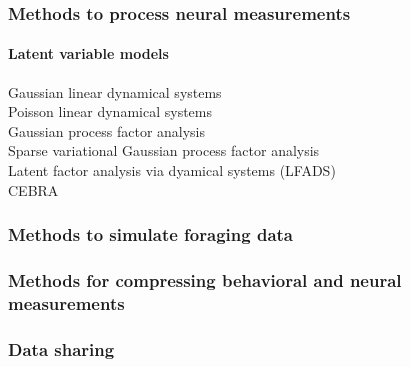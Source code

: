 \subsubsection{Methods to process neural measurements}

\paragraph{Latent variable models}

\begin{description}

    \item[Gaussian linear dynamical systems]

    \item[Poisson linear dynamical systems]

    \item[Gaussian process factor analysis]

    \item[Sparse variational Gaussian process factor analysis]

    \item[Latent factor analysis via dyamical systems (LFADS)]

    \item[CEBRA]

\end{description}

\subsubsection{Methods to simulate foraging data}

\subsubsection{Methods for compressing behavioral and neural measurements}

\subsubsection{Data sharing}

